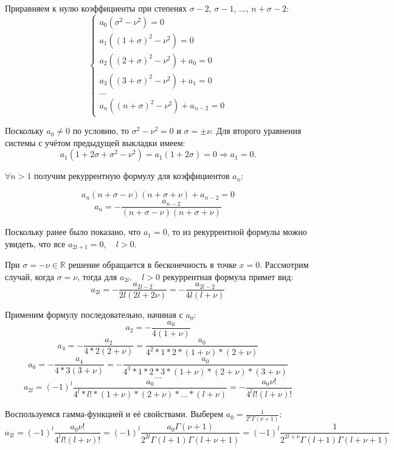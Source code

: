 \documentclass[12pt, a4paper]{report}
\begin{document}
Приравняем к нулю коэффициенты при степенях $\sigma - 2$, $\sigma - 1$, ..., $n + \sigma - 2$:
\begin{equation*}
	\begin{cases}
		a_{0} (\sigma^2 - \nu^2) = 0 \\
		a_{1}((1 + \sigma)^2 - \nu^2) = 0 \\
		a_{2}((2 + \sigma)^2 - \nu^2) + a_{0} = 0 \\
		a_{3}((3 + \sigma)^2 - \nu^2) + a_{1} = 0 \\
		... \\
		a_{n}((n + \sigma)^2 - \nu^2) + a_{n - 2} = 0
	\end{cases}
\end{equation*}

Поскольку $a_{0} \neq 0$ по условию, то $\sigma^2 - \nu^2 = 0$ и $\sigma = \pm \nu$. Для второго уравнения системы с учётом предыдущей выкладки имеем:
\[ a_{1} (1 + 2\sigma + \sigma^2 - \nu^2) = a_{1} (1 + 2\sigma) = 0 \Rightarrow a_{1} = 0. \]

$\forall n > 1$ получим рекуррентную формулу для коэффициентов $a_{n}$:

\[ a_{n} (n + \sigma - \nu)(n + \sigma + \nu) + a_{n - 2} = 0 \]
\[ a_{n} = - \frac{a_{n - 2}}{(n + \sigma - \nu)(n + \sigma + \nu)} \]

Поскольку ранее было показано, что $a_{1} = 0$, то из рекуррентной формулы можно увидеть, что все $a_{2l + 1} = 0, \quad l > 0$.

При $\sigma = -\nu \in \mathbb{R}$ решение обращается в бесконечность в точке $x = 0$. Рассмотрим случай, когда $\sigma = \nu$, тогда для $a_{2l}, \quad l > 0$ рекуррентная формула примет вид:
\[ a_{2l} = - \frac{a_{2l - 2}}{2l(2l + 2\nu)} =  - \frac{a_{2l - 2}}{4l(l + \nu)} \]

Применим формулу последовательно, начиная с $a_{0}$:
\[ a_{2} = - \frac{a_{0}}{4(1 + \nu)} \]
\[ a_{4} = - \frac{a_{2}}{4*2(2 + \nu)} = \frac{a_{0}}{4^2 *1* 2 * (1 + \nu) * (2 + \nu)}\]
\[ a_{6} = - \frac{a_{4}}{4*3(3 + \nu)} = - \frac{a_{0}}{4^3 *1* 2 * 3 * (1 + \nu) * (2 + \nu) * (3 + \nu)}\]
\[ ... \]
\[ a_{2l} = (-1)^l \frac{a_{0}}{4^l * l! * (1 + \nu) * (2 + \nu) * ... * (l + \nu)} = -\frac{a_{0} \nu!}{4^l  l! (l + \nu)!}\]

Воспользуемся гамма-функцией и её свойствами. Выберем $a_{0} = \frac{1}{2^\nu \Gamma(\nu + 1)}$:
\[ a_{2l} = (-1)^l \frac{a_{0} \nu!}{4^l  l! (l + \nu)!} = (-1)^l \frac{a_{0} \Gamma(\nu + 1)}{2^{2l}  \Gamma(l + 1) \Gamma(l + \nu + 1)} = (-1)^l \frac{1}{2^{2l + \nu}  \Gamma(l + 1) \Gamma(l + \nu + 1)}\]
\end{document}
